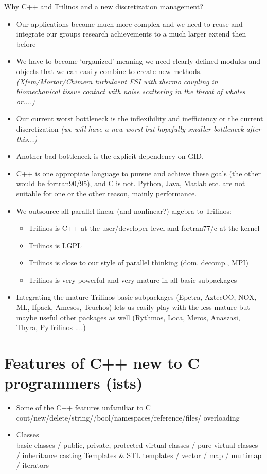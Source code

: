 Why C++ and Trilinos and a new discretization management?
\begin{itemize}
\item Our applications become much more complex and we need to reuse and
   integrate our groups research achievements to a much larger extend then
   before 
\item We have to become `organized' meaning we need clearly defined modules
   and objects that we can easily combine to create new
   methods. \emph{(Xfem/Mortar/Chimera turbulaent FSI with thermo coupling in
   biomechanical tissue contact 
   with noise scattering in the throat of whales or....)}
\item Our current worst bottleneck is the inflexibility and inefficiency or the current
discretization \emph{(we will have a new worst but hopefully smaller
bottleneck after this...)}
\item Another bad bottleneck is the explicit dependency on GID.
\item C++ is one appropiate language to pursue and achieve these goals (the other would
be fortran90/95), and C is not. Python, Java, Matlab etc. are not suitable for one or the
other reason, mainly performance.
\item We outsource all parallel linear (and nonlinear?) algebra to Trilinos:
   \begin{itemize}
   \item Trilinos is C++ at the user/developer level and fortran77/c at the
   kernel
   \item Trilinos is LGPL
   \item Trilinos is close to our style of parallel thinking (dom. decomp., MPI)
   \item Trilinos is very powerful and very mature in all basic subpackages
   \end{itemize}
\item Integrating the mature Trilinos basic subpackages (Epetra, AztecOO, NOX, ML, Ifpack,
Amesos, Teuchos) lets us easily play with the less mature but maybe useful other
packages as well (Rythmos, Loca, Meros, Anaszasi, Thyra, PyTrilinos ....)
\end{itemize}

\section{Features of C++ new to C programmers (\ccarat{}ists)}
\begin{itemize}
\item Some of the C++ features unfamiliar to C\\
      cout/new/delete/string/{}/bool/namespaces/reference/files/
      overloading
\item Classes\\
    basic classes / public, private, protected
    virtual classes / pure virtual classes / inheritance
    casting
    Templates \& STL
    templates / vector / map / multimap / iterators
\end{itemize}

